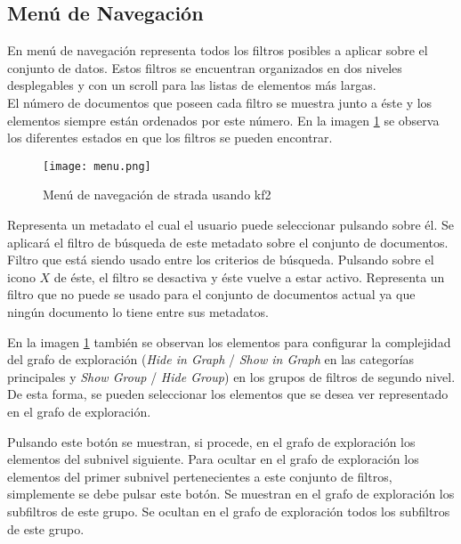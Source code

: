 \subsection{Menú de Navegación}

En menú de navegación representa todos los filtros posibles a aplicar sobre el conjunto de datos. Estos filtros se encuentran organizados en dos niveles desplegables y con un \gls{scroll} para las listas de elementos más largas.\\

El número de documentos que poseen cada filtro se muestra junto a éste y los elementos siempre están ordenados por este número. En la imagen \ref{image:manualmenu} se observa los diferentes estados en que los filtros se pueden encontrar.

\begin{figure}[h!]
  \centering
  	\texttt{[image: menu.png]}
  \caption{Menú de navegación de \gls{strada} usando \gls{kf2}}
  \label{image:manualmenu}
\end{figure}

\begin{itemize}
	 Representa un \gls{metadato} el cual el usuario puede seleccionar pulsando sobre él. Se aplicará el filtro de búsqueda de este \gls{metadato} sobre el conjunto de documentos.
	 Filtro que está siendo usado entre los criterios de búsqueda. Pulsando sobre el icono $X$ de éste, el filtro se desactiva y éste vuelve a estar activo.
	 Representa un filtro que no puede se usado para el conjunto de documentos actual ya que ningún documento lo tiene entre sus \glspl{metadato}.
\end{itemize}

En la imagen \ref{image:manualmenu} también se observan los elementos para configurar la complejidad del grafo de exploración (\textit{Hide in Graph} / \textit{Show in Graph} en las categorías principales y \textit{Show Group} / \textit{Hide Group}) en los grupos de filtros de segundo nivel. De esta forma, se pueden seleccionar los elementos que se desea ver representado en el grafo de exploración.

\begin{itemize}
	 Pulsando este botón se muestran, si procede, en el grafo de exploración los elementos del subnivel siguiente.
	 Para ocultar en el grafo de exploración los elementos del primer subnivel pertenecientes a este conjunto de filtros, simplemente se debe pulsar este botón.
	 Se muestran en el grafo de exploración los subfiltros de este grupo.
	 Se ocultan en el grafo de exploración todos los subfiltros de este grupo.
\end{itemize}

